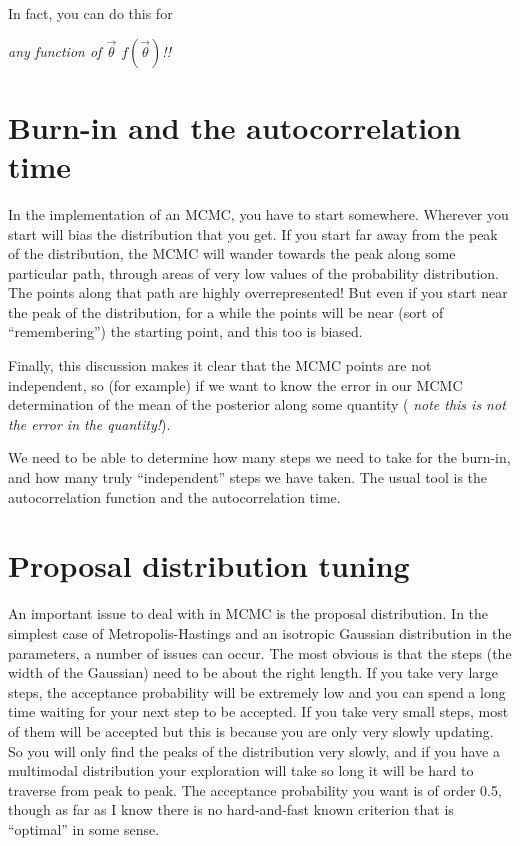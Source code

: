 In fact, you can do this for {\it any function of $\vec{\theta}$
$f(\vec{\theta})$!!

\section{Burn-in and the autocorrelation time}

In the implementation of an MCMC, you have to start
somewhere. Wherever you start will bias the distribution that you
get. If you start far away from the peak of the distribution, the MCMC
will wander towards the peak along some particular path, through areas
of very low values of the probability distribution. The points along
that path are highly overrepresented!  But even if you start near the
peak of the distribution, for a while the points will be near (sort of
``remembering'') the starting point, and this too is biased.

Finally, this discussion makes it clear that the MCMC points are not
independent, so (for example) if we want to know the error in our MCMC
determination of the mean of the posterior along some quantity ({\it
note this is not the error in the quantity!}).

We need to be able to determine how many steps we need to take for the
burn-in, and how many truly ``independent'' steps we have taken. The
usual tool is the autocorrelation function and the autocorrelation
time.

\section{Proposal distribution tuning}

An important issue to deal with in MCMC is the proposal
distribution. In the simplest case of Metropolis-Hastings and an
isotropic Gaussian distribution in the parameters, a number of issues
can occur. The most obvious is that the steps (the width of the
Gaussian) need to be about the right length. If you take very large
steps, the acceptance probability will be extremely low and you can
spend a long time waiting for your next step to be accepted. If you
take very small steps, most of them will be accepted but this is
because you are only very slowly updating. So you will only find the
peaks of the distribution very slowly, and if you have a multimodal
distribution your exploration will take so long it will be hard to
traverse from peak to peak. The acceptance probability you want is of
order 0.5, though as far as I know there is no hard-and-fast known
criterion that is ``optimal'' in some sense.

}
